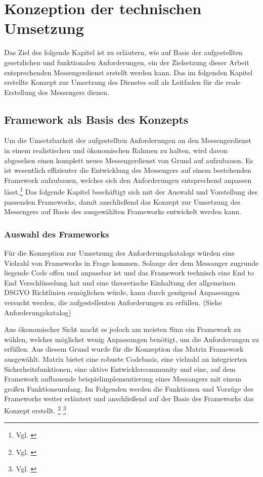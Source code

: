 \chapter{Konzeption der technischen Umsetzung}\label{chapter:tanforderungen}
Das Ziel des folgende Kapitel ist zu erläutern, wie auf Basis der aufgestellten gesetzlichen und funktionalen Anforderungen, ein der Zielsetzung dieser Arbeit entsprechenden Messengerdienst erstellt werden kann. Das im folgenden Kapitel erstellte Konzept zur Umsetzung des Dienstes soll als Leitfaden für die reale Erstellung des Messengers dienen. 

\section{Framework als Basis des Konzepts}\label{chapter:kr}
Um die Umsetzbarkeit der aufgestellten Anforderungen an den Messengerdienst in einem realistischen und ökonomischen Rahmen zu halten, wird davon abgesehen einen komplett neues Messengerdienst von Grund auf aufzubauen. Es ist wesentlich effizienter die Entwicklung des Messengers auf einem bestehenden Framework aufzubauen, welches sich den Anforderungen entsprechend anpassen lässt.\footnote{Vgl. \cite[S. 107 ff.]{Johnson2005}} Das folgende Kapitel beschäftigt sich mit der Auswahl und Vorstellung des passenden Frameworks, damit anschließend das Konzept zur Umsetzung des Messengers auf Basis des ausgewählten Frameworks entwickelt werden kann. 

\subsection{Auswahl des Frameworks}\label{chapter:am}
Für die Konzeption zur Umsetzung des Anforderungskatalogs würden eine Vielzahl von Frameworks in Frage kommen. Solange der dem Messanger zugrunde liegende Code offen und anpassbar ist und das Framework technisch eine End to End Verschlüsselung hat und eine theoretische Einhaltung der allgemeinen DSGVO Richtlinien ermöglichen würde, kann durch genügend Anpassungen versucht werden, die aufgestellenten Anforderungen zu erfüllen. (Siehe Anforderungskatalog)

Aus ökonomischer Sicht macht es jedoch am meisten Sinn ein Framework zu wählen, welches möglichst wenig Anpassungen benötigt, um die Anforderungen zu erfüllen. Aus diesem Grund wurde für die Konzeption das Matrix Framework ausgewählt.
Matrix bietet eine robuste Codebasis, eine vielzahl an integrierten Sicherheitsfunktionen, eine aktive Entwicklercommunity und eine, auf dem Framework aufbauende beispielimplementierung eines Messangers mit einem großen Funktionsumfang. Im Folgenden werden die Funktionen und Vorzüge des Frameworks weiter erläutert und anschließend auf der Basis des Frameworks das Konzept erstellt. \footnote{Vgl. \cite{Matrix.org2020}} \footnote{Vgl. \cite{Github2020}} 


